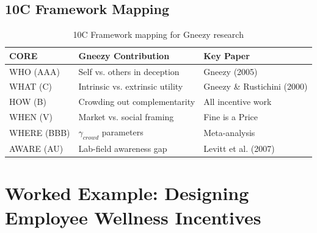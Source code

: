 \subsection{10C Framework Mapping}

\begin{table}[h]
\centering
\begin{tabular}{lll}
\hline
\textbf{CORE} & \textbf{Gneezy Contribution} & \textbf{Key Paper} \\
\hline
WHO (AAA) & Self vs. others in deception & Gneezy (2005) \\
WHAT (C) & Intrinsic vs. extrinsic utility & Gneezy \& Rustichini (2000) \\
HOW (B) & Crowding out complementarity & All incentive work \\
WHEN (V) & Market vs. social framing & Fine is a Price \\
WHERE (BBB) & $\gamma_{crowd}$ parameters & Meta-analysis \\
AWARE (AU) & Lab-field awareness gap & Levitt et al. (2007) \\
\hline
\end{tabular}
\caption{10C Framework mapping for Gneezy research}
\end{table}

\section{Worked Example: Designing Employee Wellness Incentives}

